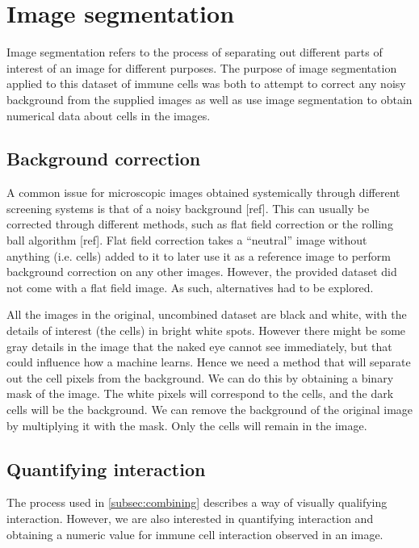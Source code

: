 \section{Image segmentation}

Image segmentation refers to the process of separating out different parts of interest of an image for different purposes. The purpose of image segmentation applied to this dataset of immune cells was both to attempt to correct any noisy background from the supplied images as well as use image segmentation to obtain numerical data about cells in the images. 

\subsection{Background correction}

A common issue for microscopic images obtained systemically through different screening systems is that of a noisy background [ref]. This can usually be corrected through different methods, such as flat field correction or the rolling ball algorithm [ref]. Flat field correction takes a ``neutral” image without anything (i.e. cells) added to it to later use it as a reference image to perform background correction on any other images. However, the provided dataset did not come with a flat field image. As such, alternatives had to be explored. 

\bigskip
All the images in the original, uncombined dataset are black and white, with the details of interest (the cells) in bright white spots. However there might be some gray details in the image that the naked eye cannot see immediately, but that could influence how a machine learns. Hence we need a method that will separate out the cell pixels from the background. We can do this by obtaining a binary mask of the image. The white pixels will correspond to the cells, and the dark cells will be the background. We can remove the background of the original image by multiplying it with the mask. Only the cells will remain in the image. 

\subsection{Quantifying interaction}

The process used in \autoref{subsec:combining} describes a way of visually qualifying interaction. However, we are also interested in quantifying interaction and obtaining a numeric value for immune cell interaction observed in an image.

